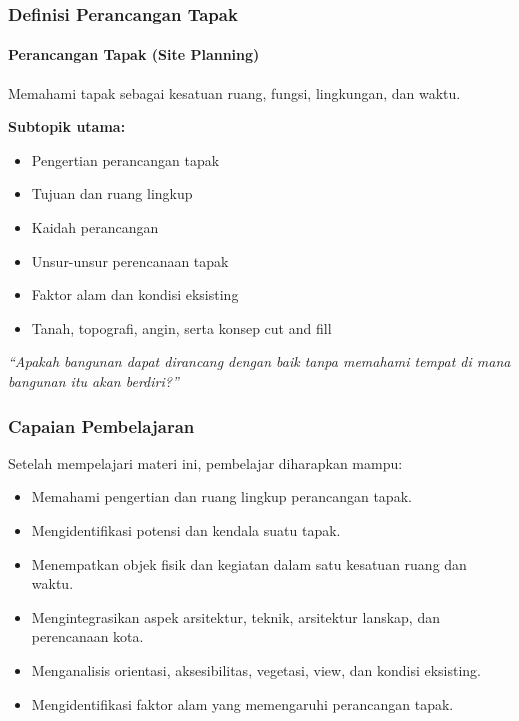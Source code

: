 \documentclass[../main.tex]{subfiles}
\begin{document}
\begin{frame}[mytitle=center, c, mycolor=digiPH_darkblue, dark]
	\frametitle{Definisi Perancangan Tapak}
	\framesubtitle{Perancangan Tapak (Site Planning)}

	Memahami tapak sebagai kesatuan ruang, fungsi, lingkungan, dan waktu.

	\vspace{0.3cm}
	\textbf{Subtopik utama:}
	\begin{itemize}
		\item Pengertian perancangan tapak
		\item Tujuan dan ruang lingkup
		\item Kaidah perancangan
		\item Unsur-unsur perencanaan tapak
		\item Faktor alam dan kondisi eksisting
		\item Tanah, topografi, angin, serta konsep cut and fill
	\end{itemize}

	\vspace{0.5cm}
	\textit{“Apakah bangunan dapat dirancang dengan baik tanpa memahami tempat di mana bangunan itu akan berdiri?”}
\end{frame}

\begin{frame}[mytitle=standard, t, mycolor=digiPH_cream, light]
	\frametitle{Capaian Pembelajaran}

	Setelah mempelajari materi ini, pembelajar diharapkan mampu:
	\begin{itemize}
		\item Memahami pengertian dan ruang lingkup perancangan tapak.
		\item Mengidentifikasi potensi dan kendala suatu tapak.
		\item Menempatkan objek fisik dan kegiatan dalam satu kesatuan ruang dan waktu.
		\item Mengintegrasikan aspek arsitektur, teknik, arsitektur lanskap, dan perencanaan kota.
		\item Menganalisis orientasi, aksesibilitas, vegetasi, view, dan kondisi eksisting.
		\item Mengidentifikasi faktor alam yang memengaruhi perancangan tapak.
	\end{itemize}
\end{frame}
\end{document}
